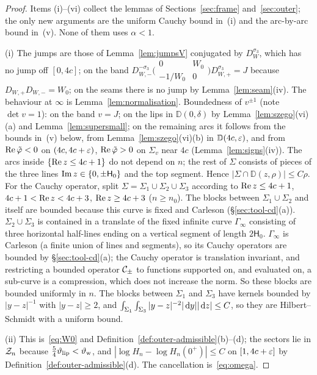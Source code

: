 \begin{proof}
Items (i)--(vi) collect the lemmas of Sections~\ref{sec:frame} and~\ref{sec:outer}; the only new arguments are the
uniform Cauchy bound in~(i) and the arc-by-arc bound in~(v). None of them uses $\alpha<1$.

(i) The jumps are those of Lemma~\ref{lem:jumpsV} conjugated by $D_W^{\sigma_3}$, which has no jump off $[0,4c]$; on the
band $D_{W,-}^{-\sigma_3}\bigl(\begin{smallmatrix}0&W_0\\-1/W_0&0\end{smallmatrix}\bigr)D_{W,+}^{\sigma_3}=J$ because
$D_{W,+}D_{W,-}=W_0$; on the seams there is no jump by Lemma~\ref{lem:seam}(iv). The behaviour at $\infty$ is
Lemma~\ref{lem:normalisation}. Boundedness of $v^{\pm1}$ (note $\det v=1$): on the band $v=J$; on the lips in
$\mathbb D(0,\delta)$ by Lemma~\ref{lem:szego}(vi)(a) and Lemma~\ref{lem:supersmall}; on the remaining arcs it follows from the
bounds in~(v) below, from Lemma~\ref{lem:szego}(vi)(b) in $\mathbb D(4c,\varepsilon)$, and from $\operatorname{Re}\tilde\varphi<0$ on $(4c,4c+\varepsilon)$,
$\operatorname{Re}\tilde\varphi>0$ on $\Sigma_v$ near $4c$ (Lemma~\ref{lem:signs}(iv)). The arcs inside $\{\operatorname{Re} z\le4c+1\}$ do not depend on
$n$; the rest of $\Sigma$ consists of pieces of the three lines $\operatorname{Im} z\in\{0,\pm \mathsf H_0\}$ and the top segment. Hence
$|\Sigma\cap \mathbb D(z,\rho)|\le C\rho$. For the Cauchy operator, split $\Sigma=\Sigma_1\cup\Sigma_2\cup\Sigma_3$ according
to $\operatorname{Re} z\le4c+1$, $4c+1<\operatorname{Re} z<4c+3$, $\operatorname{Re} z\ge4c+3$ ($n\ge n_0$). The blocks between $\Sigma_1\cup\Sigma_2$ and itself
are bounded because this curve is fixed and Carleson (\S\ref{sec:tool-cd}(a)). $\Sigma_2\cup\Sigma_3$ is contained in a
translate of the fixed infinite curve $\Gamma_\infty$ consisting of three horizontal half-lines ending on a vertical
segment of length $2\mathsf H_0$. $\Gamma_\infty$ is Carleson (a finite union of lines and segments), so its Cauchy operators
are bounded by \S\ref{sec:tool-cd}(a); the Cauchy operator is translation invariant, and restricting a bounded operator
$\mathcal{C}_\pm$ to functions supported on, and evaluated on, a sub-curve is a compression, which does not increase the
norm. So these blocks are bounded uniformly in $n$. The blocks between $\Sigma_1$ and $\Sigma_3$ have kernels bounded
by $|y-z|^{-1}$ with $|y-z|\ge2$, and $\int_{\Sigma_1}\int_{\Sigma_3}|y-z|^{-2}|\,\mathrm{d} y||\,\mathrm{d} z|\le C$, so they are
Hilbert--Schmidt with a uniform bound.

(ii) This is~\eqref{eq:W0} and Definition~\ref{def:outer-admissible}(b)--(d); the sectors lie in $\mathcal{Z}_n$ because
$\frac54\vartheta_{\mathrm{lip}}<\vartheta_{\mathrm{w}}$, and $|\log H_n-\log H_n(0^+)|\le C$ on $[1,4c+\varepsilon]$ by Definition~\ref{def:outer-admissible}(d).
The cancellation is~\eqref{eq:omega}.


\end{proof}
